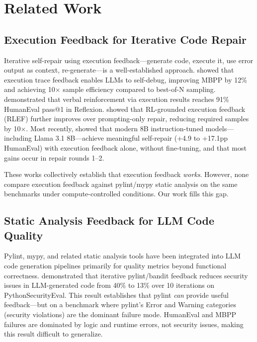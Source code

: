 \section{Related Work}
\label{sec:related}

\subsection{Execution Feedback for Iterative Code Repair}

Iterative self-repair using execution feedback---generate code, execute it, use error output as context, re-generate---is a well-established approach. \citet{Chen2023Teaching} showed that execution trace feedback enables LLMs to self-debug, improving MBPP by 12\% and achieving 10$\times$ sample efficiency compared to best-of-N sampling. \citet{Shinn2023Reflexion} demonstrated that verbal reinforcement via execution results reaches 91\% HumanEval pass@1 in Reflexion. \citet{Gehring2024RLEF} showed that RL-grounded execution feedback (RLEF) further improves over prompting-only repair, reducing required samples by 10$\times$. Most recently, \citet{Arimbur2026HowMany} showed that modern 8B instruction-tuned models---including Llama 3.1 8B---achieve meaningful self-repair (+4.9 to +17.1pp HumanEval) with execution feedback alone, without fine-tuning, and that most gains occur in repair rounds 1--2.

These works collectively establish that execution feedback \emph{works}. However, none compare execution feedback against pylint/mypy static analysis on the same benchmarks under compute-controlled conditions. Our work fills this gap.

\subsection{Static Analysis Feedback for LLM Code Quality}

Pylint, mypy, and related static analysis tools have been integrated into LLM code generation pipelines primarily for quality metrics beyond functional correctness. \citet{Blyth2025Static} demonstrated that iterative pylint/bandit feedback reduces security issues in LLM-generated code from 40\% to 13\% over 10 iterations on PythonSecurityEval. This result establishes that pylint \emph{can} provide useful feedback---but on a benchmark where pylint's Error and Warning categories (security violations) are the dominant failure mode. HumanEval and MBPP failures are dominated by logic and runtime errors, not security issues, making this result difficult to generalize.

